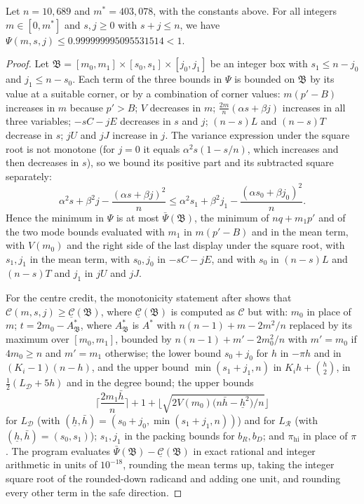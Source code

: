 \documentclass[11pt,colorlinks]{charlie}
\newcommand{\cR}{\mathcal{R}}
\newcommand{\cD}{\mathcal{D}}
\newcommand{\pihi}{\pi_{\mathrm{hi}}}
\begin{document}
\begin{proposition}\label{prop:finite}
Let $n=10{,}689$ and $m^*=403{,}078$, with the constants above. For all integers $m\in[0,m^*]$ and $s,j\ge0$ with $s+j\le n$, we have $\Psi(m,s,j)\le0.999999995095531514<1$.
\end{proposition}

\begin{proof}
Let $\mathfrak B=[m_0,m_1]\times[s_0,s_1]\times[j_0,j_1]$ be an integer box with $s_1\le n-j_0$ and $j_1\le n-s_0$. Each term of the three bounds in $\Psi$ is bounded on $\mathfrak B$ by its value at a suitable corner, or by a combination of corner values: $m(p'-B)$ increases in $m$ because $p'>B$; $V$ decreases in $m$; $\frac{2m}n(\alpha s+\beta j)$ increases in all three variables; $-sC-jE$ decreases in $s$ and $j$; $(n-s)L$ and $(n-s)T$ decrease in $s$; $jU$ and $jJ$ increase in $j$. The variance expression under the square root is not monotone (for $j=0$ it equals $\alpha^2s(1-s/n)$, which increases and then decreases in $s$), so we bound its positive part and its subtracted square separately:
\[
 \alpha^2s+\beta^2j-\frac{(\alpha s+\beta j)^2}{n}\le\alpha^2s_1+\beta^2j_1-\frac{(\alpha s_0+\beta j_0)^2}{n}.
\]
Hence the minimum in $\Psi$ is at most $\bar\Psi(\mathfrak B)$, the minimum of $nq+m_1p'$ and of the two mode bounds evaluated with $m_1$ in $m(p'-B)$ and in the mean term, with $V(m_0)$ and the right side of the last display under the square root, with $s_1,j_1$ in the mean term, with $s_0,j_0$ in $-sC-jE$, and with $s_0$ in $(n-s)L$ and $(n-s)T$ and $j_1$ in $jU$ and $jJ$.

For the centre credit, the monotonicity statement after  shows that $\mathcal C(m,s,j)\ge\underline{\mathcal C}(\mathfrak B)$, where $\underline{\mathcal C}(\mathfrak B)$ is computed as $\mathcal C$ but with: $m_0$ in place of $m$; $t=2m_0-A^*_{\mathfrak B}$, where $A^*_{\mathfrak B}$ is $A^*$ with $n(n-1)+m-2m^2/n$ replaced by its maximum over $[m_0,m_1]$, bounded by $n(n-1)+m'-2m_0^2/n$ with $m'=m_0$ if $4m_0\ge n$ and $m'=m_1$ otherwise; the lower bound $s_0+j_0$ for $h$ in $-\pi h$ and in $(K_i-1)(n-h)$, and the upper bound $\min(s_1+j_1,n)$ in $K_ih+\binom h2$, in $\frac12(L_\cD+5h)$ and in the degree bound; the upper bounds
\[
 \Big\lceil\frac{2m_1\bar h}n\Big\rceil+1+\Big\lfloor\sqrt{2V(m_0)\big(n\bar h-\underline h^2\big)/n}\Big\rfloor
\]
for $L_\cD$ (with $(\underline h,\bar h)=(s_0+j_0,\min(s_1+j_1,n))$) and for $L_\cR$ (with $(\underline h,\bar h)=(s_0,s_1)$); $s_1,j_1$ in the packing bounds for $b_R,b_D$; and $\pihi$ in place of $\pi$. The program evaluates $\bar\Psi(\mathfrak B)-\underline{\mathcal C}(\mathfrak B)$ in exact rational and integer arithmetic in units of $10^{-18}$, rounding the mean terms up, taking the integer square root of the rounded-down radicand and adding one unit, and rounding every other term in the safe direction.


\end{proof}
\end{document}
